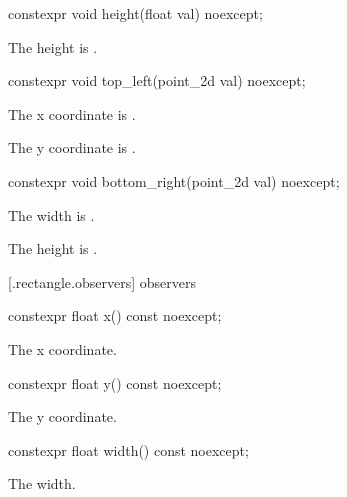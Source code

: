 %
\begin{itemdecl}
constexpr void height(float val) noexcept;
\end{itemdecl}
\begin{itemdescr}
\pnum
\effects
The height is .
\end{itemdescr}

%
\begin{itemdecl}
constexpr void top_left(point_2d val) noexcept;
\end{itemdecl}
\begin{itemdescr}
\pnum
\effects
The x coordinate is .

\effects
The y coordinate is .
\end{itemdescr}

%
\begin{itemdecl}
constexpr void bottom_right(point_2d val) noexcept;
\end{itemdecl}
\begin{itemdescr}
\pnum
\effects
The width is .

\pnum
The height is .
\end{itemdescr}

 [\iotwod.rectangle.observers]{ observers}

%
\begin{itemdecl}
constexpr float x() const noexcept;
\end{itemdecl}
\begin{itemdescr}
\pnum
\returns
The x coordinate.
\end{itemdescr}

%
\begin{itemdecl}
constexpr float y() const noexcept;
\end{itemdecl}
\begin{itemdescr}
\pnum
\returns
The y coordinate.
\end{itemdescr}

%
\begin{itemdecl}
constexpr float width() const noexcept;
\end{itemdecl}
\begin{itemdescr}
\pnum
\returns
The width.
\end{itemdescr}

